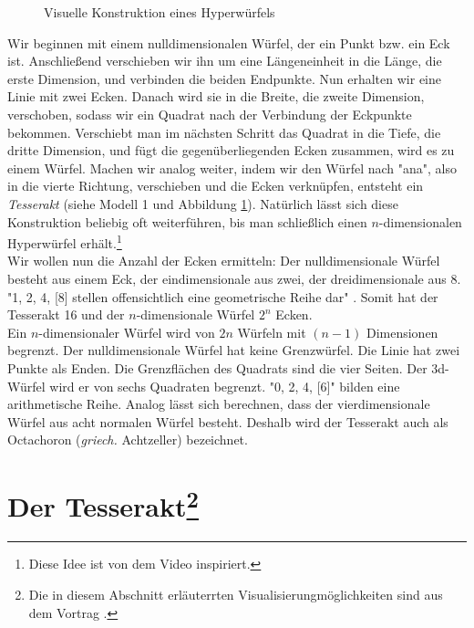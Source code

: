 \begin{figure}[h]
\centering

\caption{Visuelle Konstruktion eines Hyperwürfels}
\label{Wuerfel}
\end{figure}

Wir beginnen mit einem nulldimensionalen Würfel, der ein Punkt bzw. ein Eck ist.
Anschließend verschieben wir ihn um eine Längeneinheit in die Länge, die erste Dimension, und verbinden die beiden Endpunkte. Nun erhalten wir eine Linie mit zwei Ecken. 
Danach wird sie in die Breite, die zweite Dimension, verschoben, sodass wir ein Quadrat nach der Verbindung der Eckpunkte bekommen. Verschiebt man im nächsten Schritt das Quadrat in die Tiefe, die dritte Dimension, und fügt die gegenüberliegenden Ecken zusammen, wird es zu einem Würfel. Machen wir analog weiter, indem wir den Würfel nach "ana", also in die vierte Richtung, verschieben und die Ecken verknüpfen,  entsteht ein \emph{Tesserakt} (siehe Modell 1 und Abbildung \ref{Wuerfel}). Natürlich lässt sich diese Konstruktion beliebig oft weiterführen, bis man schließlich einen $n$-dimensionalen Hyperwürfel erhält.\footnote{Diese Idee ist von dem Video \cite{Ted} inspiriert.}
\\ \indent Wir wollen nun die Anzahl der Ecken ermitteln: Der nulldimensionale Würfel besteht aus einem Eck, der eindimensionale aus zwei, der dreidimensionale aus 8. "1, 2, 4, [8] stellen offensichtlich eine geometrische Reihe dar" \cite[S. 88]{Flatland}. Somit hat der Tesserakt 16 und der $n$-dimensionale Würfel $2^n$ Ecken. 
\\ \indent Ein $n$-dimensionaler Würfel wird von $2n$ Würfeln mit $(n-1)$ Dimensionen begrenzt. Der nulldimensionale Würfel hat keine Grenzwürfel. Die Linie hat zwei Punkte als Enden. Die Grenzflächen des Quadrats sind die vier Seiten. Der 3d-Würfel wird er von sechs Quadraten begrenzt. "0, 2, 4, [6]" \cite[S. 89]{Flatland} bilden eine arithmetische Reihe. Analog lässt sich berechnen, dass der vierdimensionale Würfel aus acht normalen Würfel besteht. Deshalb wird der Tesserakt auch als Octachoron (\textit{griech.} Achtzeller) bezeichnet.


\newpage
\section[Tesserakt]{Der Tesserakt\footnote{Die in diesem Abschnitt erläuterrten Visualisierungmöglichkeiten sind aus dem Vortrag \cite{Matt}.}}
